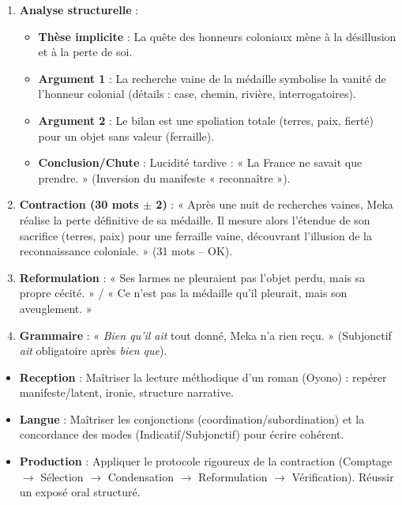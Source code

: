 \documentclass[11pt]{article}
\newcounter{popsec}
\newcounter{popsub}
\newcommand{\courssub}[1]{%
  \stepcounter{popsub}%
  \par\vspace{9pt}\noindent{\popxbold\fontsize{11.5}{13}\selectfont\color{popink}{\color{poporange}\thepopsec.\thepopsub}\hspace{6pt}#1}\par\nopagebreak\vspace{4pt}
}
\begin{document}
\begin{corrige}
\begin{enumerate}
\item \textbf{Analyse structurelle} :
\begin{itemize}
\item \textbf{Thèse implicite} : La quête des honneurs coloniaux mène à la désillusion et à la perte de soi.
\item \textbf{Argument 1} : La recherche vaine de la médaille symbolise la vanité de l'honneur colonial (détails : case, chemin, rivière, interrogatoires).
\item \textbf{Argument 2} : Le bilan est une spoliation totale (terres, paix, fierté) pour un objet sans valeur (ferraille).
\item \textbf{Conclusion/Chute} : Lucidité tardive : « La France ne savait que prendre. » (Inversion du manifeste « reconnaître »).
\end{itemize}
\item \textbf{Contraction (30 mots $\pm$ 2)} : « Après une nuit de recherches vaines, Meka réalise la perte définitive de sa médaille. Il mesure alors l'étendue de son sacrifice (terres, paix) pour une ferraille vaine, découvrant l'illusion de la reconnaissance coloniale. » (31 mots -- OK).
\item \textbf{Reformulation} : « Ses larmes ne pleuraient pas l'objet perdu, mais sa propre cécité. » / « Ce n'est pas la médaille qu'il pleurait, mais son aveuglement. »
\item \textbf{Grammaire} : « \emph{Bien qu'il ait} tout donné, Meka n'a rien reçu. » (Subjonctif \emph{ait} obligatoire après \emph{bien que}).
\end{enumerate}
\end{corrige}

\courssub{Compte-rendu et remédiation}

\begin{aretenir}
\begin{itemize}
\item \textbf{Reception} : Maîtriser la lecture méthodique d'un roman (Oyono) : repérer manifeste/latent, ironie, structure narrative.
\item \textbf{Langue} : Maîtriser les conjonctions (coordination/subordination) et la concordance des modes (Indicatif/Subjonctif) pour écrire cohérent.
\item \textbf{Production} : Appliquer le protocole rigoureux de la contraction (Comptage $\rightarrow$ Sélection $\rightarrow$ Condensation $\rightarrow$ Reformulation $\rightarrow$ Vérification). Réussir un exposé oral structuré.
\end{itemize}
\end{aretenir}
\end{document}
